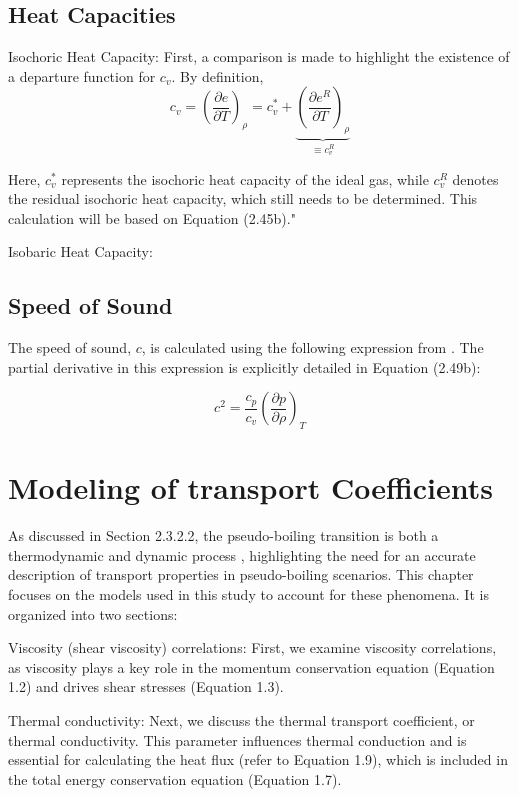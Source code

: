 \subsection{Heat Capacities}
Isochoric Heat Capacity: First, a comparison is made to highlight the existence
of a departure function for $c_v$. By definition,
\begin{equation}
c_v = \left( \frac{\partial e}{\partial T} \right)_\rho = c_v^* + \underbrace{\left( \frac{\partial e^R}{\partial T} \right)_\rho}_{\equiv c_v^R}
\end{equation}

Here, $c_v^*$ represents the isochoric heat capacity of the ideal gas, while
$c_v^R$ denotes the residual isochoric heat capacity, which still needs to be
determined. This calculation will be based on Equation (2.45b)."

Isobaric Heat Capacity: 

\subsection{Speed of Sound}
The speed of sound, $c$, is calculated using the following expression from
\cite{riazi1993use}. The partial derivative in this expression is explicitly
detailed in Equation (2.49b):

\begin{equation}
	c^2 = \frac{c_p}{c_v}\left(\frac{\partial p}{\partial \rho}\right)_T
\end{equation}

\section{Modeling of transport Coefficients}
As discussed in Section 2.3.2.2, the pseudo-boiling transition is both a
thermodynamic and dynamic process \cite{banuti2020between}, highlighting the
need for an accurate description of transport properties in pseudo-boiling
scenarios. This chapter focuses on the models used in this study to account for
these phenomena. It is organized into two sections:

Viscosity (shear viscosity) correlations: First, we examine viscosity
correlations, as viscosity plays a key role in the momentum conservation
equation (Equation 1.2) and drives shear stresses (Equation 1.3).

Thermal conductivity: Next, we discuss the thermal transport coefficient, or
thermal conductivity. This parameter influences thermal conduction and is
essential for calculating the heat flux (refer to Equation 1.9), which is
included in the total energy conservation equation (Equation 1.7).

